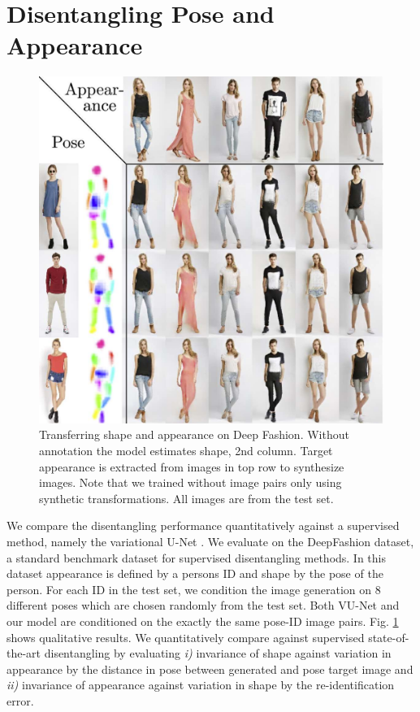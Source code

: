 \section{Disentangling Pose and Appearance}\label{sec:poseandappearance}
		\begin{figure}[htp]
			\centering
			\includegraphics[trim={0cm 0cm 0cm 0cm},clip, width=.5\linewidth]{fig/factor/swappy}
			\caption{Transferring shape and appearance on Deep Fashion. Without annotation the model estimates shape, 2nd column. Target appearance is extracted from images in top row to synthesize images. Note that we trained without image pairs only using synthetic transformations.
			All images are from the test set.}
			\label{fig:allswaps}
		\end{figure}

		We compare the disentangling performance quantitatively against a supervised method, namely the variational U-Net \cite{esser18}. We evaluate on the DeepFashion \cite{liu16deepfashion, liu16deepfashionwild} dataset, a standard benchmark dataset for supervised disentangling methods. In this dataset appearance is defined by a persons ID and shape by the pose of the person. For each ID in the test set, we condition the image generation on 8 different poses which are chosen randomly from the test set. Both VU-Net and our model are conditioned on the exactly the same pose-ID image pairs. Fig. \ref{fig:allswaps} shows qualitative results.
		We quantitatively compare against supervised state-of-the-art disentangling \cite{esser18} by evaluating \emph{i)} invariance of shape against variation in appearance by the distance in pose between generated and pose target image and \emph{ii)} invariance of appearance against variation in shape by the re-identification error.

